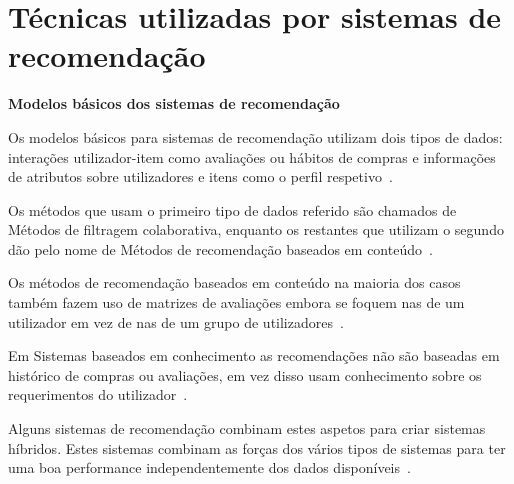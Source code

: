 \section{Técnicas utilizadas por sistemas de recomendação}

\begin{center}
\normalsize{\bfseries Modelos básicos dos sistemas de recomendação}\hfill
\end{center}


\par Os modelos básicos para sistemas de recomendação utilizam dois tipos de dados: interações utilizador-item como avaliações ou hábitos de compras e informações de atributos sobre utilizadores e itens como o perfil respetivo~\cite{ref_book1}.
\par Os métodos que usam o primeiro tipo de dados referido são chamados de Métodos de filtragem colaborativa, enquanto os restantes que utilizam o segundo dão pelo nome de Métodos de recomendação baseados em conteúdo~\cite{ref_book1}.
\par Os métodos de recomendação baseados em conteúdo na maioria dos casos também fazem uso de matrizes de avaliações embora se foquem nas de um utilizador em vez de nas de um grupo de utilizadores~\cite{ref_book1}.
\par Em Sistemas baseados em conhecimento as recomendações não são baseadas em histórico de compras ou avaliações, em vez disso usam conhecimento sobre os requerimentos do utilizador~\cite{ref_book1}.
\par Alguns sistemas de recomendação combinam estes aspetos para criar sistemas híbridos. Estes sistemas combinam as forças dos vários tipos de sistemas para ter uma boa performance independentemente dos dados disponíveis~\cite{ref_book1}.
\hfill

